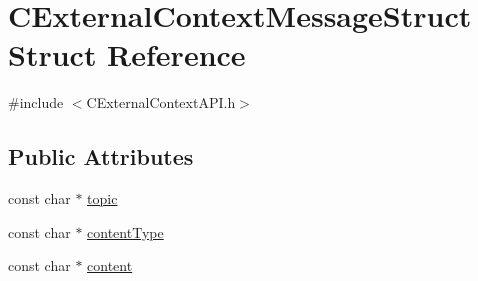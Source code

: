 \hypertarget{structCExternalContextMessageStruct}{
\section{CExternalContextMessageStruct Struct Reference}
\label{structCExternalContextMessageStruct}
}


{\ttfamily \#include $<$CExternalContextAPI.h$>$}\subsection*{Public Attributes}
\begin{DoxyCompactItemize}
\item 
const char $\ast$ \hyperlink{structCExternalContextMessageStruct_af76a4eaa22a437238ff3e5a22f19b526}{topic}
\item 
const char $\ast$ \hyperlink{structCExternalContextMessageStruct_acfddbe81c9f691f7e426498634e61a38}{contentType}
\item 
const char $\ast$ \hyperlink{structCExternalContextMessageStruct_adc3ded5f885401321f30476399a468a5}{content}
\end{DoxyCompactItemize}


